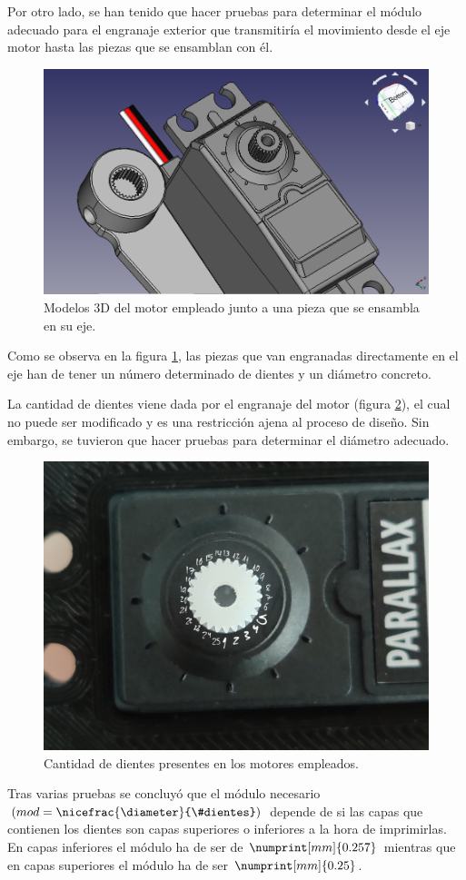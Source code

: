 Por otro lado, se han tenido que hacer pruebas para determinar el módulo adecuado para el engranaje exterior que transmitiría el movimiento desde el eje motor hasta las piezas que se ensamblan con él.

\begin{figure}[H]
    \centering
    \includegraphics[width=.7\linewidth]{pictures/ComparativaEngranajes.png}
    \caption{Modelos 3D del motor empleado junto a una pieza que se ensambla en su eje.}
    \label{fig:comparativa_engranajes}
\end{figure}

Como se observa en la figura \ref{fig:comparativa_engranajes}, las piezas que van engranadas directamente en el eje han de tener un número determinado de dientes y un diámetro concreto.

La cantidad de dientes viene dada por el engranaje del motor (figura \ref{fig:motor_teeth_count}), el cual no puede ser modificado y es una restricción ajena al proceso de diseño. Sin embargo, se tuvieron que hacer pruebas para determinar el diámetro adecuado.

\begin{figure}[H]
    \centering
    \includegraphics[width=.5\linewidth]{pictures/motor_teeth.jpg}
    \caption{Cantidad de dientes presentes en los motores empleados.}
    \label{fig:motor_teeth_count}
\end{figure}

Tras varias pruebas se concluyó que el módulo necesario 
$\left(mod = \nicefrac{\diameter}{\#dientes}\right)$ depende de si las capas que contienen 
los dientes son capas superiores o inferiores a la hora de imprimirlas.
En capas inferiores el módulo ha de ser de $\numprint[mm]{0.257}$ mientras que en
capas superiores el módulo ha de ser $\numprint[mm]{0.25}$.

